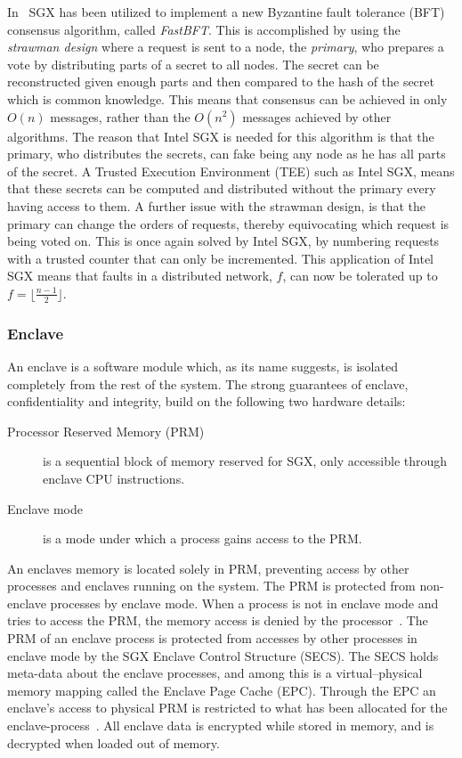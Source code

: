 \documentclass{article}
\begin{document}
		In~\cite{liu_scalable_2016} SGX has been utilized to implement a new Byzantine fault tolerance (BFT) consensus algorithm, called \textit{FastBFT}.
		This is accomplished by using the \textit{strawman design} where a request is sent to a node, the \textit{primary}, who prepares a vote by distributing parts of a secret to all nodes.
		The secret can be reconstructed given enough parts and then compared to the hash of the secret which is common knowledge.
		This means that consensus can be achieved in only $O(n)$ messages, rather than the $O(n^2)$ messages achieved by other algorithms.
		The reason that Intel SGX is needed for this algorithm is that the primary, who distributes the secrets, can fake being any node as he has all parts of the secret.
		A Trusted Execution Environment (TEE) such as Intel SGX, means that these secrets can be computed and distributed without the primary every having access to them.
		A further issue with the strawman design, is that the primary can change the orders of requests, thereby equivocating which request is being voted on.
		This is once again solved by Intel SGX, by numbering requests with a trusted counter that can only be incremented.
		This application of Intel SGX means that faults in a distributed network, $f$, can now be tolerated up to $f = \lfloor\frac{n-1}{2}\rfloor$.

			\subsubsection{Enclave}
			\label{subsec:enclave}

			An enclave is a software module which, as its name suggests, is isolated completely from the rest of the system.
			The strong guarantees of enclave, confidentiality and integrity, build on the following two hardware details:
			\begin{description}
				\item [Processor Reserved Memory (PRM)] is a sequential block of memory reserved for SGX, only accessible through enclave CPU instructions.
				\item [Enclave mode] is a mode under which a process gains access to the PRM.
			\end{description}
			An enclaves memory is located solely in PRM, preventing access by other processes and enclaves running on the system.
			The PRM is protected from non-enclave processes by enclave mode.
			When a process is not in enclave mode and tries to access the PRM, the memory access is denied by the processor~\cite{costan_intel_2016}.
			The PRM of an enclave process is protected from accesses by other processes in enclave mode by the SGX Enclave Control Structure (SECS).
			The SECS holds meta-data about the enclave processes, and among this is a virtual--physical memory mapping called the Enclave Page Cache (EPC).
			Through the EPC an enclave's access to physical PRM is restricted to what has been allocated for the enclave-process~\cite{costan_intel_2016}.
			All enclave data is encrypted while stored in memory, and is decrypted when loaded out of memory.
\end{document}
